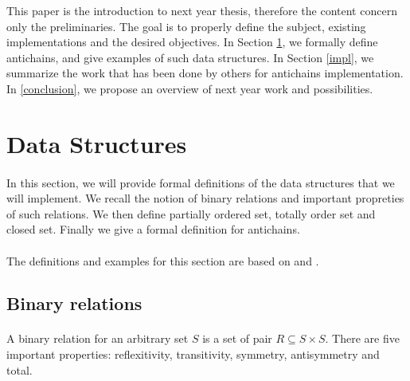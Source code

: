 \documentclass[letterpaper]{article}
\theoremstyle{definition}
\begin{document}
This paper is the introduction to next year thesis, therefore
the content concern only the preliminaries. The goal is to
properly define the subject,
existing implementations and the desired objectives.
In Section \ref{data_structures}, we formally define antichains,
and give examples of such data structures. In Section \ref{impl},
we summarize the work that has been done by others
for antichains implementation. In \ref{conclusion}, we propose
an overview of next year work and possibilities.

\newpage

\section{Data Structures}

\label{data_structures}

\paragraph{}

In this section, we will provide formal definitions of the data
structures that we will implement. We recall the notion of binary relations
and important propreties of such relations.
We then define partially ordered set, totally order set and closed set.
Finally we give a formal definition for antichains.

\paragraph{}

The definitions and examples for this section are based on \cite{bohy_phd}
and \cite{maquet_phd}.


\subsection{Binary relations}

\paragraph{}

A binary relation for an arbitrary set $S$ is
a set of pair $R \subseteq S \times S$.
There are five important properties: reflexitivity, transitivity,
symmetry, antisymmetry and total.

\paragraph{}
\end{document}
